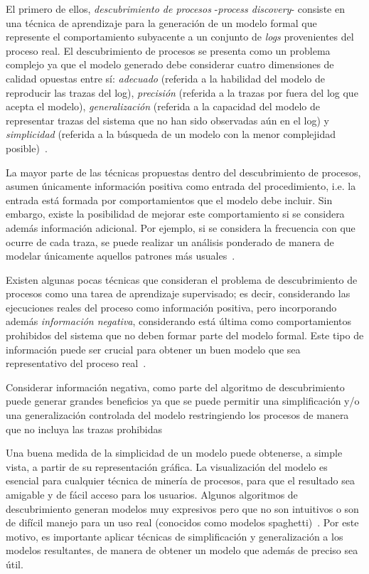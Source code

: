El primero de ellos, \textit{descubrimiento de procesos} -\textit{process discovery}- consiste
en una técnica de aprendizaje para la generación de un modelo formal que represente el comportamiento
subyacente a un conjunto de \textit{logs} provenientes del proceso real.
El descubrimiento de procesos se presenta como un problema complejo ya que 
el modelo generado debe considerar cuatro dimensiones de calidad opuestas entre sí:
\emph{adecuado} (referida a la habilidad del modelo de reproducir las trazas del log),
\emph{precisión} (referida a la trazas por fuera del log que acepta el modelo),
\emph{generalización} (referida a la capacidad del modelo de representar trazas del sistema que no han sido observadas aún en el log) y
\emph{simplicidad} (referida a la búsqueda de un modelo con la menor complejidad posible)~\cite{BuijsvDBAalst,Aalst2012}.

La mayor parte de las técnicas propuestas dentro del descubrimiento de procesos, asumen únicamente información
positiva como entrada del procedimiento, i.e. la entrada está formada por comportamientos que el modelo debe 
incluir. Sin embargo, existe la posibilidad de mejorar este comportamiento si se considera además información 
adicional. Por ejemplo, si se considera la frecuencia con que ocurre de cada traza, se puede realizar un análisis
ponderado de manera de modelar únicamente aquellos patrones más usuales~\cite{GuntherA07,WeijtersR11,LeemansFA13}.

Existen algunas pocas técnicas que consideran el problema de descubrimiento de procesos como una tarea de
aprendizaje supervisado; es decir, considerando las ejecuciones reales del proceso como información positiva, 
pero incorporando además \emph{información negativa}, considerando está última como comportamientos prohibidos 
del sistema que no deben formar parte del modelo formal. Este tipo de información puede ser crucial para 
obtener un buen modelo que sea representativo del proceso real~\cite{Ferreira2006,Lamma2007,Lamma2008,alberti2008verifiable,Goedertier2009}.

Considerar información negativa, como parte del algoritmo de descubrimiento puede generar grandes beneficios ya que
se puede permitir una simplificación y/o una generalización controlada del modelo restringiendo los procesos de 
manera que no incluya las trazas prohibidas


Una buena medida de la simplicidad de un modelo puede obtenerse, a simple vista, a partir de su representación gráfica.
La visualización del modelo es esencial para cualquier técnica de minería de procesos, para que el resultado sea amigable
y de fácil acceso para los usuarios. Algunos algoritmos de descubrimiento generan modelos muy expresivos
pero que no son intuitivos o son de difícil manejo para un uso real (conocidos como modelos spaghetti)~\cite{AalstSP11}. 
Por este motivo, es importante aplicar técnicas de simplificación y generalización a los modelos resultantes,
de manera de obtener un modelo que además de preciso sea útil.

